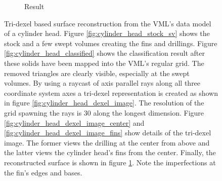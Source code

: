 \begin{figure}
\begin{subfigure}[t]{0.3\textwidth}
		\caption{Result}
		\label{fig:cylinder_head_reconstructed}
	\end{subfigure}
	\caption{
		Tri-dexel based surface reconstruction from the VML's data model of a cylinder head.
		Figure \ref{fig:cylinder_head_stock_sv} shows the stock and a few swept volumes creating the fins and drillings.
		Figure \ref{fig:cylinder_head_classified} shows the classification result after these solids have been mapped into the VML's regular grid.
		The removed triangles are clearly visible, especially at the swept volumes.
		By using a raycast of axis parallel rays along all three coordinate system axes a tri-dexel representation is created as shown in figure \ref{fig:cylinder_head_dexel_image}.
		The resolution of the grid spawning the rays is 30 along the longest dimension.
		Figure \ref{fig:cylinder_head_dexel_image_center} and \ref{fig:cylinder_head_dexel_image_fins} show details of the tri-dexel image.
		The former views the drilling at the center from above and the latter views the cylinder head's fins from the center.
		Finally, the reconstructed surface is shown in figure \ref{fig:cylinder_head_reconstructed}.
		Note the imperfections at the fin's edges and bases.
	}
	\label{fig:cylinder_head_dexel}
\end{figure}


